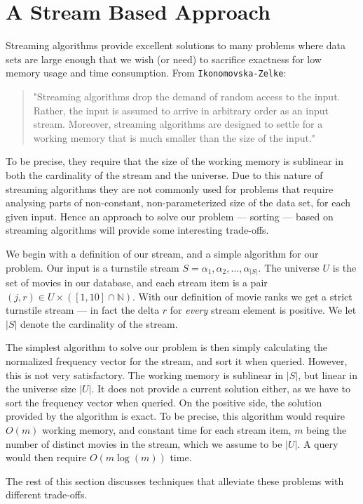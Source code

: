 \section*{A Stream Based Approach}
Streaming algorithms provide excellent solutions to many problems where data
sets are large enough that we wish (or need) to sacrifice exactness for low
memory usage and time consumption.
From \texttt{Ikonomovska\--Zelke}:
\begin{quote}
"Streaming algorithms drop the demand of random access to the input. Rather, the input
is assumed to arrive in arbitrary order as an input stream. Moreover, streaming algorithms
are designed to settle for a working memory that is much smaller than the size
of the input."
\end{quote}
To be precise, they require that the size of the working memory is sublinear in both the cardinality of the stream and the universe.
Due to this nature of streaming algorithms they are not commonly used for
problems that require analysing parts of non-constant, non-parameterized size
of the data set, for each given input. Hence an approach to
solve our problem --- sorting --- based on streaming algorithms will provide some interesting
trade-offs.

We begin with a definition of our stream, and a simple algorithm for our
problem. Our input is a turnstile stream $S = \alpha_1,
\alpha_2,\ldots,\alpha_{|S|}$. The universe
$U$ is the set of movies in our database, and each stream item is a pair
$(j,r) \in U\times \left(\left[1,10\right]\cap \mathbb{N}\right)$.
With our definition of movie ranks we get a strict turnstile stream ---
in fact the delta $r$ for \textit{every} stream element is positive.
We let $|S|$ denote the cardinality of the stream.

The simplest algorithm to solve our problem is then simply calculating the
normalized frequency vector for the stream, and sort it when queried.
However, this is not very satisfactory. The working memory is
sublinear in $|S|$, but linear in the universe size $|U|$. It
does not provide a current solution either, as we have to sort the frequency
vector when queried. On the positive side, the solution provided by the
algorithm is exact. To be precise, this algorithm would require $O(m)$ working
memory, and constant time for each stream item, $m$ being the number of distinct movies
in the stream, which we assume to be $|U|$. A query would then
require $O(m \log(m))$ time.

The rest of this section discusses techniques that alleviate these problems
with different trade-offs.

